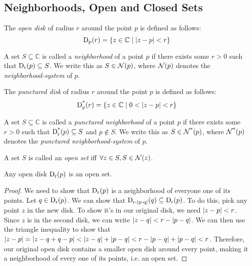 \documentclass{refbook}
\begin{document}
\subsection{Neighborhoods, Open and Closed Sets}
\begin{definition}
The \emph{open disk} of radius $r$ around the point $p$ is defined as follows:
\begin{equation*}\disk{r}{p} = \{z \in \mathbb{C} \mid \modulus{z-p} < r\}\end{equation*}
\end{definition}
\begin{definition}
A set $S \subseteq \mathbb{C}$ is called a \emph{neighborhood} of a point $p$ if there exists some $r > 0$ such that $\disk{p}{r} \subseteq S$.
We write this as $S \in \nbhd{p}$, where $\nbhd{p}$ denotes the \emph{neighborhood-system} of $p$.
\end{definition}
\begin{definition}
The \emph{punctured disk} of radius $r$ around the point $p$ is defined as follows:
\begin{equation*}\pdisk{r}{p} = \{z \in \mathbb{C} \mid 0<\modulus{z-p} < r\}\end{equation*}
\end{definition}
\begin{definition}
A set $S \subseteq \mathbb{C}$ is called a \emph{punctured neighborhood} of a point $p$ if there exists some $r > 0$ such that $\pdisk{p}{r} \subseteq S$ and $p \notin S$.
We write this as $S \in \pnbhd{p}$, where $\pnbhd{p}$ denotes the \emph{punctured neighborhood-system} of $p$.
\end{definition}
\begin{definition}
A set $S$ is called an \emph{open set} iff $\forall z \in S, S \in \nbhd{z}$.
\end{definition}
\begin{lemma}
Any open disk $\disk{p}{r}$ is an open set.
\end{lemma}
\begin{proof}
We need to show that $\disk{p}{r}$ is a neighborhood of everyone one of its points. Let $q \in \disk{p}{r}$. We can show that $\disk{q}{r-\modulus{p-q}} \subseteq \disk{p}{r}$. To do this, pick any point $z$ in the new disk. To show it's in our original disk, we need $\modulus{z-p} < r$. Since $z$ is in the second disk, we can write $\modulus{z-q} < r-\modulus{p-q}$. We can then use the triangle inequality to show that $\modulus{z-p} = \modulus{z-q+q-p} < \modulus{z-q}+\modulus{p-q} < r-\modulus{p-q}+\modulus{p-q} < r$. Therefore, our original open disk contains a smaller open disk around every point, making it a neighborhood of every one of its points, i.e. an open set.
\end{proof}
\end{document}
